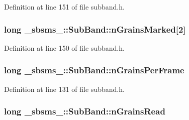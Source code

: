 Definition at line 151 of file subband.\+h.

\subsubsection[{\texorpdfstring{n\+Grains\+Marked}{nGrainsMarked}}]{\setlength{\rightskip}{0pt plus 5cm}long \+\_\+sbsms\+\_\+\+::\+Sub\+Band\+::n\+Grains\+Marked\mbox{[}2\mbox{]}\hspace{0.3cm}{\ttfamily [protected]}}\hypertarget{class__sbsms___1_1_sub_band_a22b81dda2c1c45aec7e1a9820539757f}{}\label{class__sbsms___1_1_sub_band_a22b81dda2c1c45aec7e1a9820539757f}


Definition at line 150 of file subband.\+h.

\subsubsection[{\texorpdfstring{n\+Grains\+Per\+Frame}{nGrainsPerFrame}}]{\setlength{\rightskip}{0pt plus 5cm}long \+\_\+sbsms\+\_\+\+::\+Sub\+Band\+::n\+Grains\+Per\+Frame\hspace{0.3cm}{\ttfamily [protected]}}\hypertarget{class__sbsms___1_1_sub_band_af6465a1ec67cfb77f2d99ee9ed1bf660}{}\label{class__sbsms___1_1_sub_band_af6465a1ec67cfb77f2d99ee9ed1bf660}


Definition at line 131 of file subband.\+h.

\subsubsection[{\texorpdfstring{n\+Grains\+Read}{nGrainsRead}}]{\setlength{\rightskip}{0pt plus 5cm}long \+\_\+sbsms\+\_\+\+::\+Sub\+Band\+::n\+Grains\+Read\hspace{0.3cm}{\ttfamily [protected]}}\hypertarget{class__sbsms___1_1_sub_band_afde42b420ea71cdc20c628e74f3f3698}{}\label{class__sbsms___1_1_sub_band_afde42b420ea71cdc20c628e74f3f3698}


